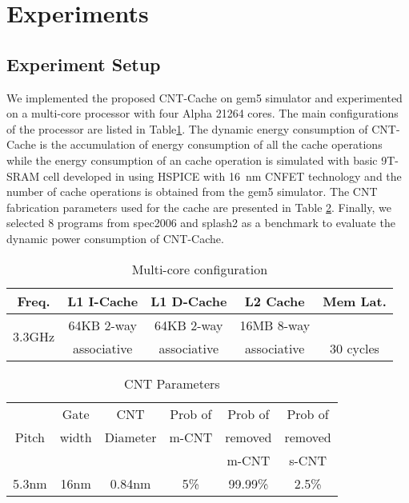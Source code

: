 \section{Experiments} \label{sec:result}
\subsection{Experiment Setup}
We implemented the proposed CNT-Cache on gem5 simulator \cite{binkert2011gem5} 
and experimented on a multi-core processor with four Alpha 21264 cores. 
The main configurations of the processor are listed in Table\ref{tab:exp_setup}. 
The dynamic energy consumption of CNT-Cache is the accumulation of energy consumption 
of all the cache operations while the energy consumption of an cache operation 
is simulated with basic 9T-SRAM cell developed in \cite{CNFET2015model} using 
HSPICE with \SI{16}{nm} CNFET technology and the number of cache operations is 
obtained from the gem5 simulator. The CNT fabrication parameters used for 
the cache are presented in Table \ref{tab:CNT-parameter}. Finally, we selected 
8 programs from spec2006 and splash2 as a benchmark to evaluate the dynamic power 
consumption of CNT-Cache.

\begin{table}
    \centering
  \caption{Multi-core configuration}
  \label{tab:exp_setup}
  \begin{tabular}{ccccc}
    \toprule
      \multirow{1}{*}{Freq.} &L1 I-Cache  &L1 D-Cache  &L2 Cache & Mem Lat.\\
    \midrule
      \multirow{3}{*}{3.3GHz} &64KB 2-way &64KB 2-way &16MB 8-way &\\
                &associative  &associative  &associative  &30 cycles\\
  \bottomrule
\end{tabular}
\vspace{-1em}
\end{table}

\begin{table}
    \centering
    \caption{CNT Parameters\cite{sun2017high}}
    \label{tab:CNT-parameter}
    \begin{tabular}{cccccc}
      \toprule
        \multirow{3}{*}{Pitch} &Gate &CNT &Prob of &Prob of  &Prob of\\
                &width &Diameter &m-CNT &removed &removed\\
                &  &  &  &m-CNT & s-CNT\\
      \midrule
        5.3nm &16nm &0.84nm &5\%  &99.99\%  &2.5\% \\
      \bottomrule
    \end{tabular}
\vspace{-1em}
\end{table}

